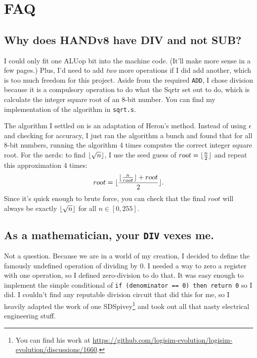 \documentclass[12pt, oneside]{memoir}
\DeclarePairedDelimiter{\floor}{\lfloor}{\rfloor}
\newcommand{\instruction}[1]{{\color{instruction}\texttt{#1}}}
\begin{document}
\section{FAQ}
\subsection{Why does HANDv8 have DIV and not SUB?}
I could only fit one ALUop bit into the machine code. (It'll make more sense in a few pages.) Plus, I'd need to add \textit{two} more operations if I did add another, which is too much freedom for this project. Aside from the required \instruction{ADD}, I chose division because it is a compulsory operation to do what the Sqrtr set out to do, which is calculate the integer square root of an 8-bit number. You can find my implementation of the algorithm in \texttt{sqrt.s}.

The algorithm I settled on is an adaptation of Heron's method. Instead of using $\epsilon$ and checking for accuracy, I just ran the algorithm a bunch and found that for all 8-bit numbers, running the algorithm 4 times computes the correct integer square root. For the nerds: to find $\floor{\sqrt{n}}$, I use the seed guess of $root = \floor{\frac{n}{2}}$ and repeat this approximation 4 times:
\begin{equation*}
    root = \floor{\frac{\floor{\frac{n}{root}} + root}{2}}.
\end{equation*}
Since it's quick enough to brute force, you can check that the final $root$ will always be exactly $\floor{\sqrt{n}}$ for all $n \in [0,255]$.

\subsection{As a mathematician, your \instruction{DIV} vexes me.}
Not a question. Because we are in a world of my creation, I decided to define the famously undefined operation of dividing by 0. I needed a way to zero a register with one operation, so I defined zero-division to do that. It was easy enough to implement the simple conditional of \texttt{if (denominator == 0) then return 0} so I did. I couldn't find any reputable division circuit that did this for me, so I heavily adapted the work of one SDSpivey\footnote{You can find his work at \href{https://github.com/logisim-evolution/logisim-evolution/discussions/1660}{https://github.com/logisim-evolution/logisim-evolution/discussions/1660}.} 
and took out all that nasty electrical engineering stuff.
\end{document}
